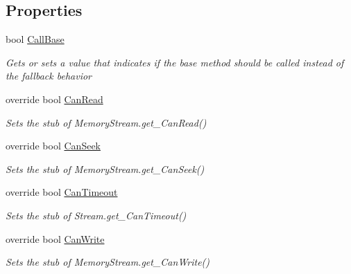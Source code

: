 \subsection*{Properties}
\begin{DoxyCompactItemize}
\item 
bool \hyperlink{class_system_1_1_i_o_1_1_fakes_1_1_stub_memory_stream_a2ac31444704a7f4f57c65eca419bf643}{Call\-Base}
\begin{DoxyCompactList}\small\item\em Gets or sets a value that indicates if the base method should be called instead of the fallback behavior\end{DoxyCompactList}\item 
override bool \hyperlink{class_system_1_1_i_o_1_1_fakes_1_1_stub_memory_stream_a7621a80c79a0e9a419703fd5555a5b5f}{Can\-Read}
\begin{DoxyCompactList}\small\item\em Sets the stub of Memory\-Stream.\-get\-\_\-\-Can\-Read()\end{DoxyCompactList}\item 
override bool \hyperlink{class_system_1_1_i_o_1_1_fakes_1_1_stub_memory_stream_a129f8c62a74603f286609eb4d830c6f5}{Can\-Seek}
\begin{DoxyCompactList}\small\item\em Sets the stub of Memory\-Stream.\-get\-\_\-\-Can\-Seek()\end{DoxyCompactList}\item 
override bool \hyperlink{class_system_1_1_i_o_1_1_fakes_1_1_stub_memory_stream_a1bbf4edb0ea3c05e7897561c71edb832}{Can\-Timeout}
\begin{DoxyCompactList}\small\item\em Sets the stub of Stream.\-get\-\_\-\-Can\-Timeout()\end{DoxyCompactList}\item 
override bool \hyperlink{class_system_1_1_i_o_1_1_fakes_1_1_stub_memory_stream_a90826956a12744d8a76a43909428bff8}{Can\-Write}
\begin{DoxyCompactList}\small\item\em Sets the stub of Memory\-Stream.\-get\-\_\-\-Can\-Write()\end{DoxyCompactList}\item 

\end{DoxyCompactItemize}
